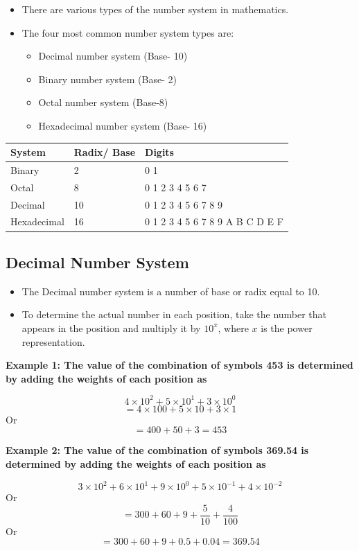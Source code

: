 \documentclass[]{book}
\providecommand{\tightlist}{%
  \setlength{\itemsep}{0pt}\setlength{\parskip}{0pt}}
\begin{document}
\begin{itemize}
\item
  There are various types of the number system in mathematics.
\item
  The four most common number system types are:

  \begin{itemize}
  \tightlist
  \item
    Decimal number system (Base- 10)
  \item
    Binary number system (Base- 2)
  \item
    Octal number system (Base-8)
  \item
    Hexadecimal number system (Base- 16)
  \end{itemize}
\end{itemize}

\begin{longtable}[]{@{}lll@{}}
\toprule
System & Radix/ Base & Digits\tabularnewline
\midrule
\endhead
Binary & 2 & 0 1\tabularnewline
Octal & 8 & 0 1 2 3 4 5 6 7\tabularnewline
Decimal & 10 & 0 1 2 3 4 5 6 7 8 9\tabularnewline
Hexadecimal & 16 & 0 1 2 3 4 5 6 7 8 9 A B C D E F\tabularnewline
\bottomrule
\end{longtable}

\hypertarget{decimal-number-system}{%
\subsection{Decimal Number System}\label{decimal-number-system}}

\begin{itemize}
\item
  The Decimal number system is a number of base or radix equal to 10.
\item
  To determine the actual number in each position, take the number that appears in the position and multiply it by \(10^x\), where \(x\) is the power representation.
\end{itemize}

\textbf{Example 1: The value of the combination of symbols 453 is determined by adding the weights of each position as}

\[4\times10^2+5\times10^1+3\times10^0\]
\[= 4\times100 + 5\times10+3\times1\]
Or \[= 400+50+3 = 453\]

\textbf{Example 2: The value of the combination of symbols 369.54 is determined by adding the weights of each position as}

\[3\times10^2+6\times10^1+9\times10^0+5\times10^{-1}+4\times10^{-2}\]
Or \[= 300 + 60+9+\frac{5}{10}+\frac{4}{100}\]
Or \[= 300 + 60+9+0.5+0.04= 369.54\]
\end{document}
